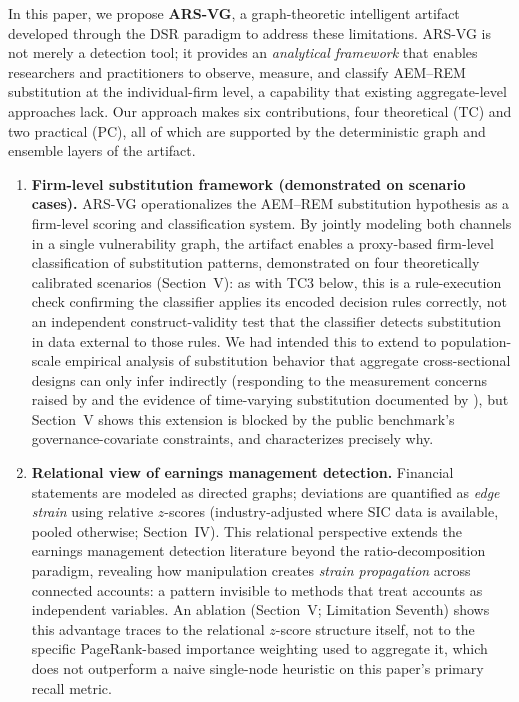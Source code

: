 \documentclass[12pt]{article}
\begin{document}
In this paper, we propose \textbf{ARS-VG}, a graph-theoretic intelligent
artifact developed through the DSR paradigm to address these limitations.  ARS-VG is not
merely a detection tool; it provides an \emph{analytical framework} that
enables researchers and practitioners to observe, measure, and classify
AEM--REM substitution at the individual-firm level, a capability that
existing aggregate-level approaches lack.  Our approach makes six
contributions, four theoretical (TC) and two practical (PC), all of
which are supported by the deterministic graph and ensemble layers
of the artifact.

\begin{enumerate}
    \item[\textbf{TC1}] \textbf{Firm-level substitution framework
    (demonstrated on scenario cases).}  ARS-VG
    operationalizes the AEM--REM substitution hypothesis
    \citep{zang2012,cohen2008} as a firm-level scoring and classification
    system.  By jointly modeling both channels in a single vulnerability
    graph, the artifact enables a proxy-based firm-level classification
    of substitution patterns, demonstrated on four theoretically
    calibrated scenarios (Section~V): as with TC3 below, this is a
    rule-execution check confirming the classifier applies its encoded
    decision rules correctly, not an independent construct-validity test
    that the classifier detects substitution in data external to those
    rules.  We had intended this
    to extend to population-scale empirical analysis of
    substitution behavior that aggregate cross-sectional designs can only
    infer indirectly (responding to the measurement concerns raised by
    \citet{cohenlys2022} and the evidence of time-varying substitution
    documented by \citet{pincus2022}), but Section~V shows this
    extension is blocked by the public benchmark's governance-covariate
    constraints, and characterizes precisely why.

    \item[\textbf{TC2}] \textbf{Relational view of earnings management
    detection.}  Financial statements are modeled as directed graphs;
    deviations are quantified as \emph{edge strain} using relative
    $z$-scores (industry-adjusted where SIC data is available, pooled
    otherwise; Section~IV).  This relational perspective extends the earnings management
    detection literature beyond the ratio-decomposition paradigm, revealing
    how manipulation creates \emph{strain propagation} across connected
    accounts: a pattern invisible to methods that treat accounts as
    independent variables.  An ablation (Section~V; Limitation Seventh)
    shows this advantage
    traces to the relational $z$-score structure itself, not to the
    specific PageRank-based importance weighting used to aggregate it,
    which does not outperform a naive single-node heuristic on this
    paper's primary recall metric.


\end{enumerate}
\end{document}
